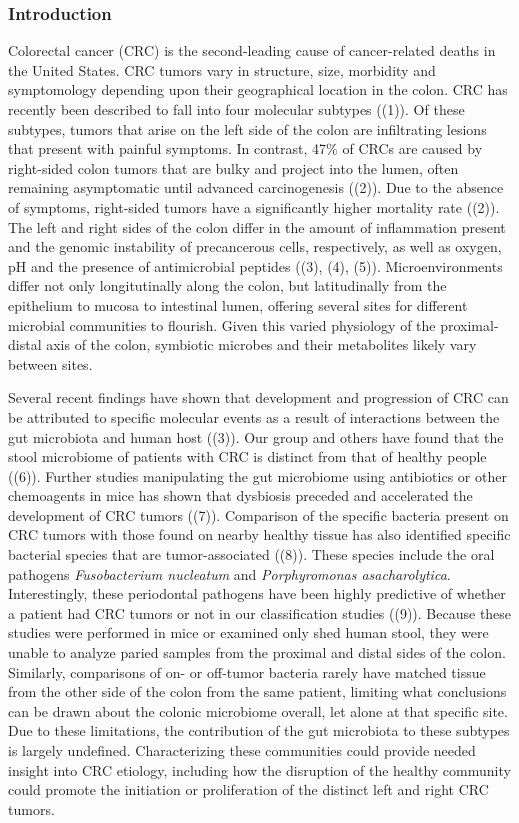 \documentclass[11pt,]{article}
\begin{document}
\subsubsection{Introduction}\label{introduction}

Colorectal cancer (CRC) is the second-leading cause of cancer-related
deaths in the United States. CRC tumors vary in structure, size,
morbidity and symptomology depending upon their geographical location in
the colon. CRC has recently been described to fall into four molecular
subtypes ((1)). Of these subtypes, tumors that arise on the left side of
the colon are infiltrating lesions that present with painful symptoms.
In contrast, 47\% of CRCs are caused by right-sided colon tumors that
are bulky and project into the lumen, often remaining asymptomatic until
advanced carcinogenesis ((2)). Due to the absence of symptoms,
right-sided tumors have a significantly higher mortality rate ((2)). The
left and right sides of the colon differ in the amount of inflammation
present and the genomic instability of precancerous cells, respectively,
as well as oxygen, pH and the presence of antimicrobial peptides ((3),
(4), (5)). Microenvironments differ not only longitutinally along the
colon, but latitudinally from the epithelium to mucosa to intestinal
lumen, offering several sites for different microbial communities to
flourish. Given this varied physiology of the proximal-distal axis of
the colon, symbiotic microbes and their metabolites likely vary between
sites.

Several recent findings have shown that development and progression of
CRC can be attributed to specific molecular events as a result of
interactions between the gut microbiota and human host ((3)). Our group
and others have found that the stool microbiome of patients with CRC is
distinct from that of healthy people ((6)). Further studies manipulating
the gut microbiome using antibiotics or other chemoagents in mice has
shown that dysbiosis preceded and accelerated the development of CRC
tumors ((7)). Comparison of the specific bacteria present on CRC tumors
with those found on nearby healthy tissue has also identified specific
bacterial species that are tumor-associated ((8)). These species include
the oral pathogens \emph{Fusobacterium nucleatum} and
\emph{Porphyromonas asacharolytica}. Interestingly, these periodontal
pathogens have been highly predictive of whether a patient had CRC
tumors or not in our classification studies ((9)). Because these studies
were performed in mice or examined only shed human stool, they were
unable to analyze paried samples from the proximal and distal sides of
the colon. Similarly, comparisons of on- or off-tumor bacteria rarely
have matched tissue from the other side of the colon from the same
patient, limiting what conclusions can be drawn about the colonic
microbiome overall, let alone at that specific site. Due to these
limitations, the contribution of the gut microbiota to these subtypes is
largely undefined. Characterizing these communities could provide needed
insight into CRC etiology, including how the disruption of the healthy
community could promote the initiation or proliferation of the distinct
left and right CRC tumors.
\end{document}
